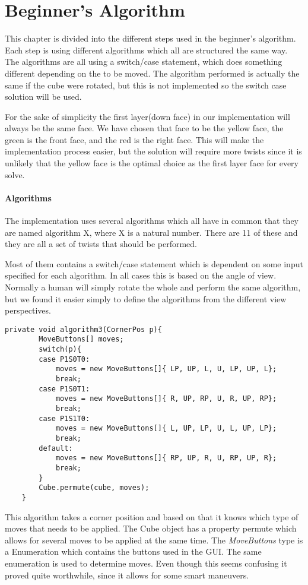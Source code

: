 \chapter{Beginner's Algorithm}

This chapter is divided into the different steps used in the beginner's algorithm.
Each step is using different algorithms which all are structured the same way. The algorithms are all using a switch/case statement, which does something different depending on the \cpiece{} to be moved. The algorithm performed is actually the same if the cube were rotated, but this is not implemented so the switch case solution will be used.

For the sake of simplicity the first layer(down face) in our implementation will always be the same face. We have chosen that face to be the yellow face, the green is the front face, and the red is the right face. This will make the implementation process easier, but the solution will require more twists since it is unlikely that the yellow face is the optimal choice as the first layer face for every solve.

\subsubsection{Algorithms}
The implementation uses several algorithms which all have in common that they are named algorithm X, where X is a natural number. There are 11 of these and they are all a set of twists that should be performed. 

Most of them contains a switch/case statement which is dependent on some input specified for each algorithm. In all cases this is based on the angle of view. Normally a human will simply rotate the whole \cube{} and perform the same algorithm, but we found it easier simply to define the algorithms from the different view perspectives. 
\begin{verbatim}
private void algorithm3(CornerPos p){
		MoveButtons[] moves;
		switch(p){
		case P1S0T0:
			moves = new MoveButtons[]{ LP, UP, L, U, LP, UP, L};
			break;
		case P1S0T1:
			moves = new MoveButtons[]{ R, UP, RP, U, R, UP, RP};
			break;
		case P1S1T0:
			moves = new MoveButtons[]{ L, UP, LP, U, L, UP, LP};
			break;
		default:
			moves = new MoveButtons[]{ RP, UP, R, U, RP, UP, R};
			break;
		}
		Cube.permute(cube, moves);
	}
\end{verbatim}
This algorithm takes a corner position and based on that it knows which type of moves that needs to be applied. The Cube object has a property permute which allows for several moves to be applied at the same time. The \textit{MoveButtons} type is a Enumeration which contains the buttons used in the GUI. The same enumeration is used to determine moves. Even though this seems confusing it proved quite worthwhile, since it allows for some smart maneuvers. 

